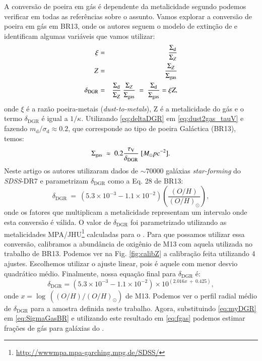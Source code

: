 A conversão de poeira em gás é dependente da metalicidade segundo podemos verificar em todas as
referências sobre o assunto. Vamos explorar a conversão de poeira em gás em BR13, onde os autores
seguem o modelo de extinção de \citet{Charlot.Fall.2000a} e identificam algumas variáveis que vamos
utilizar:
\begin{eqnarray}
	\xi &=& \frac{\Sigma_{\mathrm{d}}}{\Sigma_Z} \\
	Z &=& \frac{\Sigma_Z}{\Sigma_{\mathrm{gas}}}  \\
	\delta_{\mathrm{DGR}} &=& \frac{\Sigma_{\mathrm{d}}}{\Sigma_Z}\ \frac{\Sigma_Z}{\Sigma_{\mathrm{gas}}}\ =\
\frac{\Sigma_{\mathrm{d}}}{\Sigma_{\mathrm{gas}}} = \xi Z,
	\label{eq:deltaDGR}
\end{eqnarray}
\noindent onde $\xi$ é a razão poeira-metais ({\em dust-to-metals}), Z é a metalicidade do gás e o
termo $\delta_{\mathrm{DGR}}$ é igual a $1/\kappa$. Utilizando \eqref{eq:deltaDGR} em
\eqref{eq:dust2gas_tauV} e fazendo $m_{\mathrm{d}}/\sigma_{\mathrm{d}} \approx 0.2$, que corresponde
ao tipo de poeira Galáctica (BR13), temos:
\begin{equation}
	\Sigma_{\mathrm{gas}}\ \approx\ 0.2 \frac{\tau_{\mathrm{V}}}{\delta_{\mathrm{DGR}}}\ [M_\odot pc^{-2}].
	\label{eq:SigmaGasBR}
\end{equation}
Neste artigo os autores utilizaram dados de $\sim 70000$ galáxias {\em star-forming} do
\textit{SDSS}-DR7 e parametrizam $\delta_{\mathrm{DGR}}$ como a Eq. 28 de BR13:
\begin{equation}
	\delta_{\mathrm{DGR}}\ =\ (5.3 \times 10^{-3} - 1.1 \times 10^{-2})
\left(\frac{(O/H)}{(O/H)_\odot}\right),
	\label{eq:DGR_brinch_eq28}
\end{equation}
\noindent onde os fatores que multiplicam a metalicidade representam um intervalo onde esta
conversão é válida. O valor de $\delta_{\mathrm{DGR}}$ foi parametrizado utilizando as metalicidades
MPA/JHU\footnote{\href{http://wwwmpa.mpa-garching.mpg.de/SDSS/}{http://wwwmpa.mpa-garching.mpg.de/SDSS/}}
calculadas para o \SDSS. Para que possamos utilizar essa conversão, calibramos a abundância de
oxigênio de M13 com aquela utilizada no trabalho de BR13. Podemos ver na Fig. \ref{fig:calibZ} a
calibração feita utilizando 4 ajustes. Escolhemos utilizar o ajuste linear, pois é aquele com menor
desvio quadrático médio. Finalmente, nossa equação final para $\delta_{\mathrm{DGR}}$ é:
\begin{equation}
	\delta_{\mathrm{DGR}} =  (5.3 \times 10^{-3} - 1.1 \times 10^{-2}) \times 10^{\left(2.016 x\ +\ 0.425\right)},
	\label{eq:myDGR}
\end{equation}
\noindent onde $x = \log\ ((O/H)/(O/H)_\odot)$ de M13. Podemos ver o perfil radial médio de
$\delta_{\mathrm{DGR}}$ para a amostra definida neste trabalho. Agora, substituindo \eqref{eq:myDGR}
em \eqref{eq:SigmaGasBR} e utilizando este resultado em \eqref{eq:fgas} podemos estimar frações de
gás para galáxias do \CAL.

